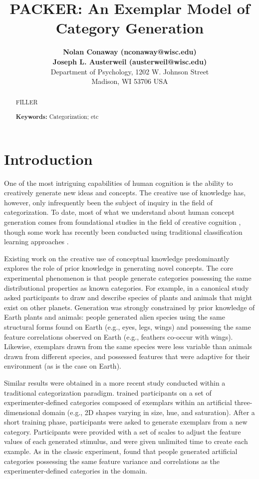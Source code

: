 \documentclass[10pt,letterpaper]{article}
\title{PACKER: An Exemplar Model of Category Generation}
\author{
{ \large \bf Nolan Conaway (nconaway@wisc.edu) } \\
{ \large \bf Joseph L. Austerweil (austerweil@wisc.edu) } \\
Department of Psychology, 1202 W. Johnson Street \\
Madison, WI 53706 USA
}
\begin{document}
\maketitle

\begin{abstract}
FILLER

\textbf{Keywords:} 
Categorization; etc
\end{abstract}

\section{Introduction}

One of the most intriguing capabilities of human cognition is the ability to creatively generate new ideas and concepts. The creative use of knowledge has, however, only infrequently been the subject of inquiry in the field of categorization. To date, most of what we understand about human concept generation comes from foundational studies in the field of creative cognition \citep[e.g.,][]{marsh1999inadvertent,smith1993constraining,ward2002role,ward1994structured,ward1995s}, though some work has recently been conducted using traditional classification learning approaches \citep{jern2013probabilistic}. 

Existing work on the creative use of conceptual knowledge predominantly explores the role of prior knowledge in generating novel concepts. The core experimental phenomenon is that people generate categories possessing the same distributional properties as known categories. For example, in a canonical study \citet{ward1994structured} asked participants to draw and describe species of plants and animals that might exist on other planets. Generation was strongly constrained by prior knowledge of Earth plants and animals: people generated alien species using the same structural forms found on Earth (e.g., eyes, legs, wings) and possessing the same feature correlations observed on Earth (e.g., feathers co-occur with wings). Likewise, exemplars drawn from the same species were less variable than animals drawn from different species, and possessed features that were adaptive for their environment (as is the case on Earth).

Similar results were obtained in a more recent study conducted within a traditional categorization paradigm. \citet{jern2013probabilistic} trained participants on a set of experimenter-defined categories composed of exemplars within an artificial three-dimensional domain (e.g., 2D shapes varying in size, hue, and saturation). After a short training phase, participants were asked to generate exemplars from a new category. Participants were provided with a set of scales to adjust the feature values of each generated stimulus, and were given unlimited time to create each example. As in the classic \cite{ward1994structured} experiment, \citet{jern2013probabilistic} found that people generated artificial categories possessing the same feature variance and correlations as the experimenter-defined categories in the domain.
\end{document}
